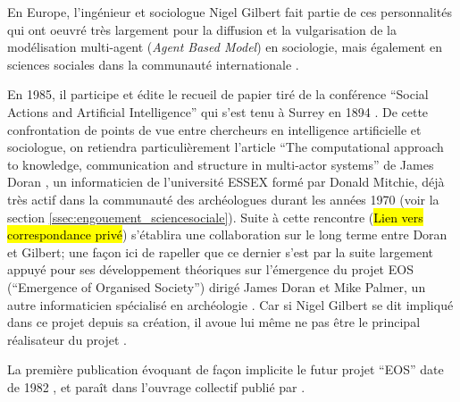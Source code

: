 
En Europe, l'ingénieur et sociologue Nigel Gilbert fait partie de ces personnalités qui ont oeuvré très largement pour la diffusion et la vulgarisation de la modélisation multi-agent (\textit{Agent Based Model}) en sociologie, mais également en sciences sociales dans la communauté internationale .

En 1985, il participe et édite le recueil de papier tiré de la conférence \foreignquote{english}{Social Actions and Artificial Intelligence} qui s'est tenu à Surrey en 1894 \autocite{Gilbert1985}. De cette confrontation de points de vue entre chercheurs en intelligence artificielle et sociologue, on retiendra particulièrement l'article \foreignquote{english}{The computational approach to knowledge, communication and structure in multi-actor systems} de James Doran \autocite{Doran1985}, un informaticien de l'université ESSEX formé par Donald Mitchie, déjà très actif dans la communauté des archéologues durant les années 1970 (voir la section \ref{ssec:engouement_sciencesociale}). Suite à cette rencontre (\hl{Lien vers correspondance privé}) s'établira une collaboration sur le long terme entre Doran et Gilbert; une façon ici de rapeller que ce dernier s'est par la suite largement appuyé pour ses développement théoriques sur l'émergence du projet EOS (\foreignquote{english}{Emergence of Organised Society}) dirigé James Doran et Mike Palmer, un autre informaticien spécialisé en archéologie \autocite{Doran1994a, Gilbert1995a}. Car si Nigel Gilbert se dit impliqué dans ce projet depuis sa création, il avoue lui même ne pas être le principal réalisateur du projet . \autocite[122-131]{Gilbert1995a}


La première publication évoquant de façon implicite le futur projet \foreignquote{english}{EOS} date de 1982 \autocite{Doran1982}, et paraît dans l'ouvrage collectif publié par \textcite{Renfrew1982}.


